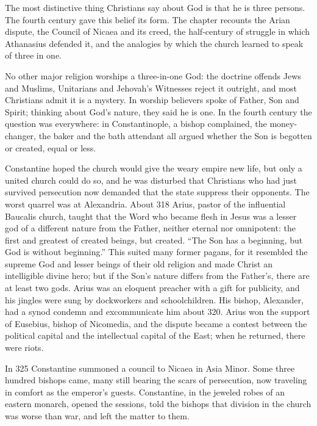 
\begin{inbrief}
The most distinctive thing Christians say about God is that he is three persons. The fourth century
gave this belief its form. The chapter recounts the Arian dispute, the Council of Nicaea and its creed,
the half-century of struggle in which Athanasius defended it, and the analogies by which the church
learned to speak of three in one.
\end{inbrief}

No other major religion worships a three-in-one God: the doctrine offends Jews and Muslims, Unitarians and Jehovah's Witnesses reject it outright, and most Christians admit it is a mystery. In worship
believers spoke of Father, Son and Spirit; thinking about God's nature, they said he is one. In the
fourth century the question was everywhere: in Constantinople, a bishop complained, the money-changer,
the baker and the bath attendant all argued whether the Son is begotten or created, equal or less.

Constantine hoped the church would give the weary empire new life, but only a united church could do
so, and he was disturbed that Christians who had just survived persecution now demanded that the state
suppress their opponents. The worst quarrel was at Alexandria. About 318 Arius, pastor of the
influential Baucalis church, taught that the Word who became flesh in Jesus was a lesser god of a
different nature from the Father, neither eternal nor omnipotent: the first and greatest of created
beings, but created. ``The Son has a beginning, but God is without beginning.'' This suited many
former pagans, for it resembled the supreme God and lesser beings of their old religion and made
Christ an intelligible divine hero; but if the Son's nature differs from the Father's, there are at
least two gods. Arius was an eloquent preacher with a gift for publicity, and his jingles were sung by
dockworkers and schoolchildren. His bishop, Alexander, had a synod condemn and excommunicate him about
320. Arius won the support of Eusebius, bishop of Nicomedia, and the dispute became a contest between
the political capital and the intellectual capital of the East; when he returned, there were riots.

In 325 Constantine summoned a council to Nicaea in Asia Minor. Some three hundred bishops came, many
still bearing the scars of persecution, now traveling in comfort as the emperor's guests. Constantine,
in the jeweled robes of an eastern monarch, opened the sessions, told the bishops that division in the
church was worse than war, and left the matter to them.

